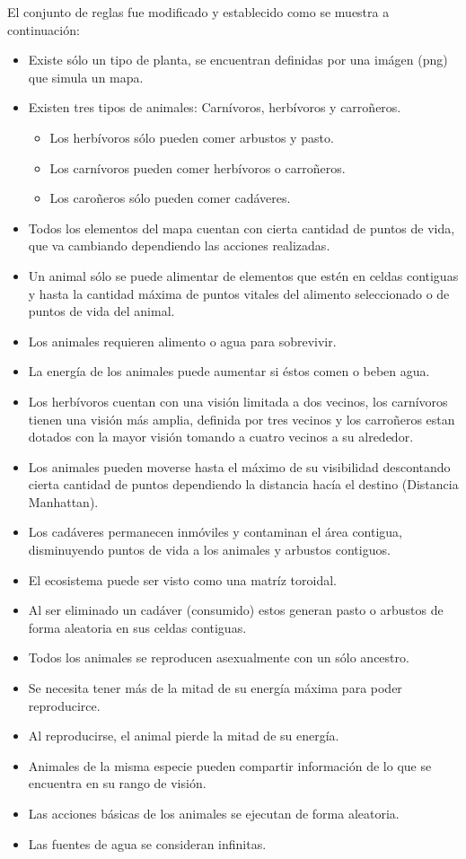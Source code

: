   El conjunto de reglas fue modificado y establecido como se muestra a continuación:
    \begin{itemize}
      \item{Existe sólo un tipo de planta, se encuentran definidas por una imágen (png) que simula un mapa.}
      \item{Existen tres tipos de animales: Carnívoros, herbívoros y carroñeros.}
      \begin{itemize}
        \item{Los herbívoros sólo pueden comer arbustos y pasto.}
        \item{Los carnívoros pueden comer herbívoros o carroñeros.}
        \item{Los caroñeros sólo pueden comer cadáveres.}
      \end{itemize}
      \item{Todos los elementos del mapa cuentan con cierta cantidad de puntos de vida, que va cambiando dependiendo las acciones realizadas.}
      \item{Un animal sólo se puede alimentar de elementos que estén en celdas contiguas y hasta la cantidad máxima de puntos vitales del alimento seleccionado o de puntos de vida del animal.}
      \item{Los animales requieren alimento o agua para sobrevivir.}
      \item{La energía de los animales puede aumentar si éstos comen o beben agua.}
      \item{Los herbívoros cuentan con una visión limitada a dos vecinos, los carnívoros tienen una visión más amplia, definida por tres vecinos y los carroñeros estan dotados con la mayor visión tomando a cuatro vecinos a su alrededor.}
      \item{Los animales pueden moverse hasta el máximo de su visibilidad descontando cierta cantidad de puntos dependiendo la distancia hacía el destino (Distancia Manhattan).}
      \item{Los cadáveres permanecen inmóviles y contaminan el área contigua, disminuyendo puntos de vida a los animales y arbustos contiguos.}
      \item{El ecosistema puede ser visto como una matríz toroidal.}
      \item{Al ser eliminado un cadáver (consumido) estos generan pasto o arbustos de forma aleatoria en sus celdas contiguas.}
      \item{Todos los animales se reproducen asexualmente con un sólo ancestro.}
      \item{Se necesita tener más de la mitad de su energía máxima para poder reproducirce.}
      \item{Al reproducirse, el animal pierde la mitad de su energía.}
      \item{Animales de la misma especie pueden compartir información de lo que se encuentra en su rango de visión.}
      \item{Las acciones básicas de los animales se ejecutan de forma aleatoria.}
      \item{Las fuentes de agua se consideran infinitas.}
    \end{itemize}
